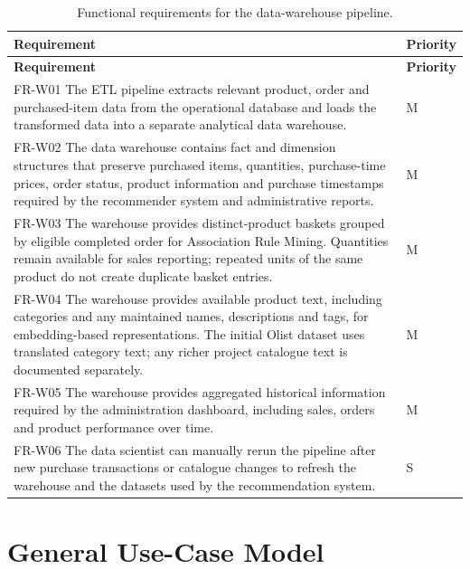 \documentclass[a4paper,12pt]{article}
\newcommand{\tablestyle}{%
  \small\setstretch{1.05}%
  \renewcommand{\arraystretch}{1.25}%
  \setlength{\extrarowheight}{3pt}%
  \arrayrulecolor{tableborder}%
}
\newcommand{\req}[1]{\textsf{\small #1}}
\begin{document}
{\tablestyle
\begin{longtable}{|L{\dimexpr\textwidth-2cm-4\arrayrulewidth\relax}|C{2cm}|}
  \caption{Functional requirements for the data-warehouse pipeline.}
  \label{tab:fr-dw}\\
  \hline
  \textbf{Requirement} & \textbf{Priority} \\
  \hline
  \endfirsthead
  \hline
  \textbf{Requirement} & \textbf{Priority} \\
  \hline
  \endhead
  \endfoot
  \endlastfoot

  \req{FR-W01} The ETL pipeline extracts relevant product, order and purchased-item data from the
  operational database and loads the transformed data into a separate analytical data warehouse. & M \\[3pt]\hline
  \req{FR-W02} The data warehouse contains fact and dimension structures that preserve purchased
  items, quantities, purchase-time prices, order status, product information and purchase timestamps
  required by the recommender system and administrative reports. & M \\[3pt]\hline
  \req{FR-W03} The warehouse provides distinct-product baskets grouped by eligible completed order
  for Association Rule Mining. Quantities remain available for sales reporting; repeated units of
  the same product do not create duplicate basket entries. & M \\[3pt]\hline
  \req{FR-W04} The warehouse provides available product text, including categories and any maintained
  names, descriptions and tags, for embedding-based representations. The initial Olist dataset uses
  translated category text; any richer project catalogue text is documented separately. & M \\[3pt]\hline
  \req{FR-W05} The warehouse provides aggregated historical information required by the administration
  dashboard, including sales, orders and product performance over time. & M \\[3pt]\hline
  \req{FR-W06} The data scientist can manually rerun the pipeline after new purchase transactions or
  catalogue changes to refresh the warehouse and the datasets used by the recommendation system. & S \\[3pt]\hline
\end{longtable}
}
\clearpage
\section{General Use-Case Model}
\label{sec:usecase}
\end{document}
